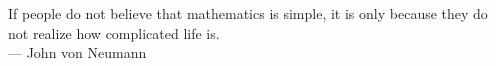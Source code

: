 
\cleardoublepage
{}
\thispagestyle{empty}

\vspace*{3cm}

\begin{center}
If people do not believe that mathematics is simple, it is only because they do not realize how complicated life is.
\\ \medskip
--- John von Neumann
\end{center}

\medskip
